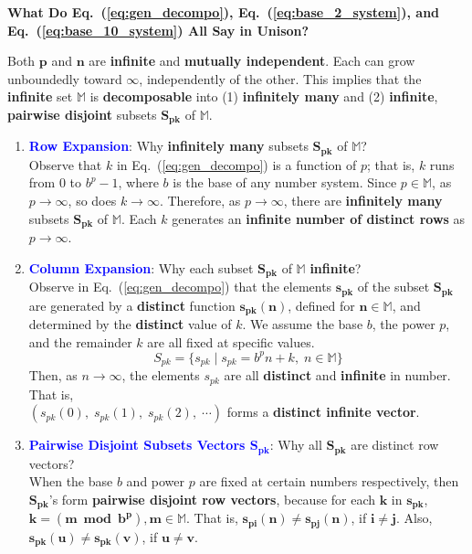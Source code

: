 \documentclass[12pt]{article}
\theoremstyle{definition} %
\numberwithin{equation}{section}
\newcommand{\eqrefc}[1]{Eq.~(\ref{eq:#1})}
\newcommand{\boldblu}[1]			    {\textbf{\textcolor{blue}{#1}}}
\begin{document}
\noindent \textbf{What Do \eqrefc{gen_decompo}, \eqrefc{base_2_system}, and \eqrefc{base_10_system} All Say in Unison?}

\vspace{1em}
Both \(\bm{p}\) and \(\bm{n}\) are \textbf{infinite} and \textbf{mutually independent}. Each can grow unboundedly toward \(\infty\), independently of the other. This implies that the \textbf{infinite} set \(\mathbb{M}\) is \textbf{decomposable} into (1) \textbf{infinitely many} and (2) \textbf{infinite}, \textbf{pairwise disjoint} subsets \(\bm{S}_{\bm{p}\bm{k}}\) of \(\mathbb{M}\).

\begin{enumerate}
\item  \boldblu{Row Expansion}: Why \textbf{infinitely many} subsets \(\bm{S_{pk}}\) of \(\mathbb{M}\)?\\[1ex]
Observe that \(k\) in \eqrefc{gen_decompo} is a function of \(p\); that is, \(k\) runs from \(0\) to \(b^p - 1\), where \(b\) is the base of any number system. Since \(p \in \mathbb{M}\), as \(p \to \infty\), so does \(k \to \infty\). Therefore, as \(p \to \infty\), there are \textbf{infinitely many} subsets \(\bm{S_{pk}}\) of \(\mathbb{M}\). Each \(k\) generates an \textbf{infinite number of distinct rows} as \(p \to \infty\).
 
\item  \boldblu{Column Expansion}: Why each subset \(\bm{S}_{\bm{p}\bm{k}}\) of \(\mathbb{M}\) \textbf{infinite}?\\[1ex]
Observe in \eqrefc{gen_decompo} that the elements \(\bm{s_{pk}}\) of the subset \(\bm{S_{pk}}\) are generated by a \textbf{distinct} function \(\bm{s_{pk}(n)}\), defined for \(\bm{n} \in \mathbb{M}\), and determined by the \textbf{distinct} value of \(k\). We assume the base \(b\), the power \(p\), and the remainder \(k\) are all fixed at specific values.
\[
	S_{pk} = \{s_{pk} \mid s_{pk} = b^p n + k,\; n \in \mathbb{M} \}
\]
Then, as \(n \to \infty\), the elements \(s_{pk}\) are all \textbf{distinct} and \textbf{infinite} in number. That is,\\
\((s_{pk}(0),\; s_{pk}(1),\; s_{pk}(2),\; \cdots)\) forms a \textbf{distinct infinite vector}.

\item \boldblu{Pairwise Disjoint Subsets Vectors \(\bm{S_{pk}}\)}: Why all \(\bm{S_{pk}}\) are distinct row vectors?\\[1ex]
When the base \(b\) and power \(p\) are fixed at certain numbers respectively, then \(\bm{S_{pk}}\)'s form \textbf{pairwise disjoint row vectors}, because for each \(\bm{k}\) in \(\bm{s_{pk}}\), \( \bm{k = (m\bmod b^p), m \in \mathbb{M}} \). That is, \(\bm{s_{pi}(n)} \neq \bm{s_{pj}(n)}\), if \( \bm{ i \neq j }\). Also, \(\bm{s_{pk}(u)} \neq \bm{s_{pk}(v)}\), if \( \bm{ u \neq v }\).


\end{enumerate}
\end{document}
